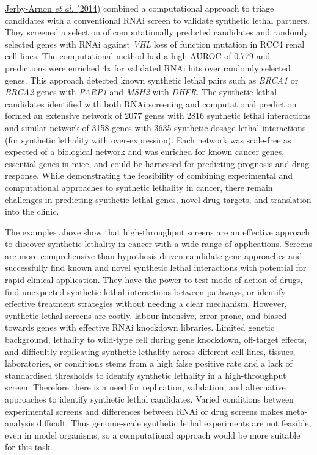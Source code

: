 \hyperlink{ENREF53}{Jerby-Arnon}\hyperlink{ENREF53}{\textit{ et al.}}\hyperlink{ENREF53}{ (2014)} combined a computational approach to triage candidates with a conventional RNAi screen to validate synthetic lethal partners. They screened a selection of computationally predicted candidates and randomly selected genes with RNAi against \textit{VHL} loss of function mutation in RCC4 renal cell lines. The computational method had a high AUROC of 0.779 and predictions were enriched 4x for validated RNAi hits over randomly selected genes. This approach detected known synthetic lethal pairs such as \textit{BRCA1} or \textit{BRCA2} genes with \textit{PARP1} and \textit{MSH2} with \textit{DHFR}. The synthetic lethal candidates identified with both RNAi screening and computational prediction formed an extensive network of 2077 genes with 2816 synthetic lethal interactions and similar network of 3158 genes with 3635 synthetic dosage lethal interactions (for synthetic lethality with over-expression). Each network was scale-free as expected of a biological network and was enriched for known cancer genes, essential genes in mice, and could be harnessed for predicting prognosis and drug response. While demonstrating the feasibility of combining experimental and computational approaches to synthetic lethality in cancer, there remain challenges in predicting synthetic lethal genes, novel drug targets, and translation into the clinic.  

The examples above show that high-throughput screens are an effective approach to discover synthetic lethality in cancer with a wide range of applications. Screens are more comprehensive than hypothesis-driven candidate gene approaches and successfully find known and novel synthetic lethal interactions with potential for rapid clinical application. They have the power to test mode of action of drugs, find unexpected synthetic lethal interactions between pathways, or identify effective treatment strategies without needing a clear mechanism. However, synthetic lethal screens are costly, labour-intensive, error-prone, and biased towards genes with effective RNAi knockdown libraries. Limited genetic background, lethality to wild-type cell during gene knockdown, off-target effects, and difficultly replicating synthetic lethality across different cell lines, tissues, laboratories, or conditions stems from a high false positive rate and a lack of standardised thresholds to identify synthetic lethality in a high-throughput screen. Therefore there is a need for replication, validation, and alternative approaches to identify synthetic lethal candidates. Varied conditions between experimental screens and differences between RNAi or drug screens makes meta-analysis difficult. Thus genome-scale synthetic lethal experiments are not feasible, even in model organisms, so a computational approach would be more suitable for this task.  

